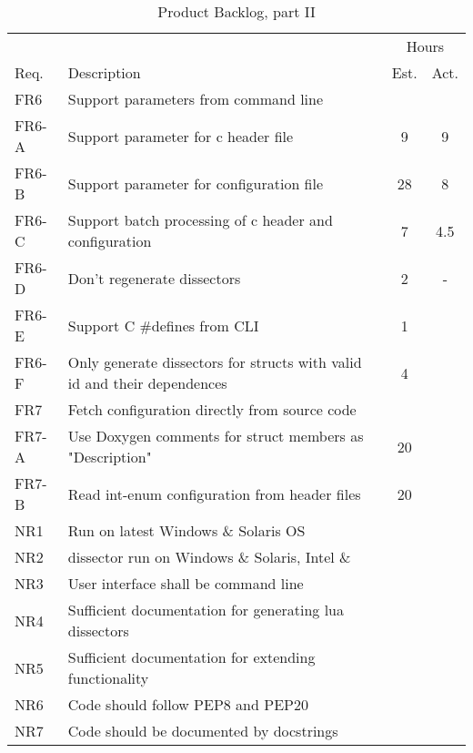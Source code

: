 \begin{table}[ht] \small \center
\caption{Product Backlog, part II \label{tab:prodbacklog2}}
\begin{tabularx}{\textwidth}{l X c c}
	\toprule
	& & \multicolumn{2}{c}{Hours} \\
	\cmidrule(r){3-4}
	Req. & Description & Est. & Act. \\
	\midrule	
	FR6 & Support parameters from command line & & \\
	FR6-A & Support parameter for \Gls{c} \gls{header} file & 9 & 9 \\
	FR6-B & Support parameter for configuration file & 28 & 8 \\
	FR6-C & Support batch processing of \Gls{c} \gls{header} and configuration & 7 & 4.5 \\
	FR6-D & Don't regenerate \glspl{dissector} & 2 & - \\
	FR6-E & Support C \#defines from CLI & 1 & \\
	FR6-F & Only generate dissectors for structs with valid id and their dependences & 4 & \\
    \addlinespace
	FR7 & Fetch configuration directly from source code & & \\
	FR7-A & Use Doxygen comments for struct members as "Description" & 20 & \\
	FR7-B & Read int-enum configuration from header files & 20 & \\
	\addlinespace
	NR1 & Run on latest \Gls{Windows} \& \Gls{Solaris} OS & & \\
	NR2 & \Gls{dissector} run on \Gls{Windows} \& \Gls{Solaris}, Intel \& \GLS{sparc} & & \\
	NR3 & User interface shall be command line & & \\
	NR4 & Sufficient documentation for generating \Gls{lua} \glspl{dissector} & & \\
	NR5 & Sufficient documentation for extending functionality & & \\
	NR6 & Code should follow PEP8 and PEP20 & & \\
	NR7 & Code should be documented by docstrings & & \\
	\bottomrule
\end{tabularx}
\end{table}








